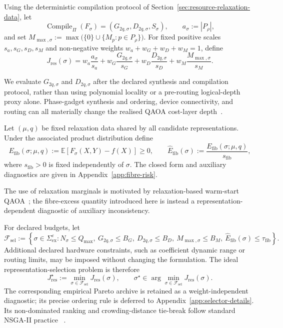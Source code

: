 \documentclass[a4paper,onecolumn,11pt,unpublished]{quantumarticle}
\theoremstyle{remark}
\begin{document}
Using the deterministic compilation protocol of
Section~\ref{sec:resource-relaxation-data}, let
\[
\operatorname{Compile}_{\Pi}(F_\sigma)
=
(G_{2q,\sigma},D_{2q,\sigma},S_\sigma),
\qquad
a_\sigma:=|P_\rho|,
\]
and set
\(
M_{\max,\sigma}:=
\max\bigl(\{0\}\cup\{M_p:p\in P_\rho\}\bigr).
\)
For fixed positive scales $s_a,s_G,s_D,s_M$ and non-negative weights
$w_a+w_G+w_D+w_M=1$, define
\begin{equation}
J_{\mathrm{res}}(\sigma)
=
w_a\frac{a_\sigma}{s_a}
+w_G\frac{G_{2q,\sigma}}{s_G}
+w_D\frac{D_{2q,\sigma}}{s_D}
+w_M\frac{M_{\max,\sigma}}{s_M}.
\label{eq:Jres}
\end{equation}

We evaluate $G_{2q,\sigma}$ and $D_{2q,\sigma}$ after the declared synthesis
and compilation protocol, rather than using polynomial locality or a
pre-routing logical-depth proxy alone.  Phase-gadget synthesis and ordering,
device connectivity, and routing can all materially change the realised QAOA
cost-layer depth~\cite{Verchere2023,Weidenfeller2022,Pelofske2024,Rovara2026}.

Let $(\mu,q)$ be fixed relaxation data shared by all candidate
representations. Under the associated product distribution define
\begin{equation}
E_{\mathrm{fib}}(\sigma;\mu,q)
:=
\mathbb E\!\left[F_\sigma(X,Y)-f(X)\right]\ge0,
\qquad
\widehat E_{\mathrm{fib}}(\sigma)
:=
\frac{E_{\mathrm{fib}}(\sigma;\mu,q)}{s_{\mathrm{fib}}},
\label{eq:fibre-excess-short}
\end{equation}
where $s_{\mathrm{fib}}>0$ is fixed independently of $\sigma$.
The closed form and auxiliary diagnostics are given in
Appendix~\ref{app:fibre-risk}.

The use of relaxation marginals is motivated by relaxation-based warm-start
QAOA~\cite{Egger2021,TateSDP2023}; the fibre-excess quantity introduced here is
instead a representation-dependent diagnostic of auxiliary inconsistency.

For declared budgets, let
\begin{equation}
\mathcal F_{\mathrm{sel}}
:=
\left\{
\sigma\in\Sigma_{\mathrm{ex}}^\varepsilon:
N_\sigma\le Q_{\max},\
G_{2q,\sigma}\le B_G,\
D_{2q,\sigma}\le B_D,\
M_{\max,\sigma}\le B_M,\
\widehat E_{\mathrm{fib}}(\sigma)\le\tau_{\mathrm{fib}}
\right\}.
\label{eq:selection-feasible-set}
\end{equation}
Additional declared hardware constraints, such as coefficient dynamic range
or routing limits, may be imposed without changing the formulation. The ideal representation-selection problem is therefore
\begin{equation}
J_{\mathrm{res}}^\star
:=
\min_{\sigma\in\mathcal F_{\mathrm{sel}}}
J_{\mathrm{res}}(\sigma),
\qquad
\sigma^\star\in
\arg\min_{\sigma\in\mathcal F_{\mathrm{sel}}}
J_{\mathrm{res}}(\sigma).
\label{eq:selection-problem}
\end{equation}
The corresponding empirical Pareto archive is retained as a
weight-independent diagnostic; its precise ordering rule is deferred to
Appendix~\ref{app:selector-details}.  Its non-dominated ranking and
crowding-distance tie-break follow standard NSGA-II practice
~\cite{DebEtAl2002}.
\end{document}
